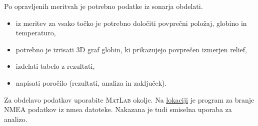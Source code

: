 \noindent
Po opravljenih meritvah je potrebno podatke iz sonarja obdelati.
\begin{itemize}
	\item iz meritev za vsako točko je potrebno določiti povprečni položaj, globino in temperaturo,
	\item potrebno je izrisati 3D graf globin, ki prikazujejo povprečen izmerjen relief,
	\item izdelati tabelo z rezultati,
	\item napisati poročilo (rezultati, analiza in zaključek).
\end{itemize}

\noindent
Za obdelavo podatkov uporabite \textsc{MatLab} okolje. Na \href{https://drive.google.com/open?id=0B1dT-CBA07ANSXl2YmIxcXdUQkk}{lokaciji} je program za branje NMEA podatkov iz nmea datoteke. Nakazana je tudi smiselna uporaba za analizo.

